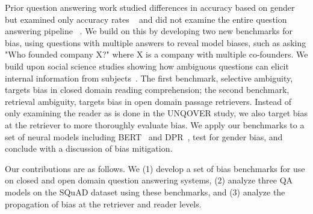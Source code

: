 Prior question answering work studied differences in accuracy based on gender but examined only accuracy rates ~\cite{gor2021towards} and did not examine the entire question answering pipeline ~\cite{li2020unqovering}.  We build on this by developing two new benchmarks for bias, using questions with multiple answers to reveal model biases, such as asking "Who founded company X?" where X is a company with multiple co-founders.
We build upon social science studies showing how ambiguous questions can elicit internal information from subjects~\citep{dunning1989ambiguity}. 
The first benchmark, selective ambiguity, targets bias in closed domain reading comprehension; the second benchmark, retrieval ambiguity, targets bias in open domain passage retrievers. 
Instead of only examining the reader as is done in the UNQOVER study, we also target bias at the retriever to more thoroughly evaluate bias. 
We apply our benchmarks to a set of neural models including BERT~\cite{devlin2018bert} and DPR~\cite{karpukhin2020dense}, test for gender bias, and conclude with a discussion of bias mitigation. 

Our contributions are as follows.
We (1) develop a set of bias benchmarks for use on closed and open domain question answering systems, (2) analyze three QA models on the SQuAD dataset using these benchmarks, and (3) analyze the propagation of bias at the retriever and reader levels. 


